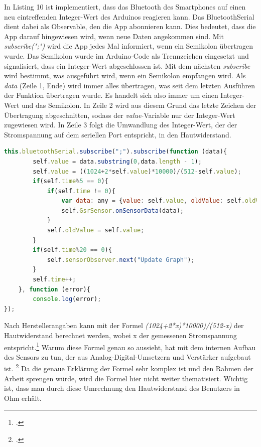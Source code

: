 \newline
In Listing 10 ist implementiert, dass das Bluetooth des Smartphones auf einen neu eintreffenden Integer-Wert des Arduinos reagieren kann. Das BluetoothSerial dient dabei als Observable, den die App abonnieren kann. Dies bedeutet, dass die App darauf hingewiesen wird, wenn neue Daten angekommen sind. Mit \textit{subscribe(";")} wird die App jedes Mal informiert, wenn ein Semikolon übertragen wurde. Das Semikolon wurde im Arduino-Code als Trennzeichen eingesetzt und signalisiert, dass ein Integer-Wert abgeschlossen ist. Mit dem nächsten \textit{subscribe} wird bestimmt, was ausgeführt wird, wenn ein Semikolon empfangen wird. Als \textit{data} (Zeile 1, Ende) wird immer alles übertragen, was seit dem letzten Ausführen der Funktion übertragen wurde. Es handelt sich also immer um einen Integer-Wert und das Semikolon. In Zeile 2 wird aus diesem Grund das letzte Zeichen der Übertragung abgeschnitten, sodass der \textit{value}-Variable nur der Integer-Wert zugewiesen wird.
In Zeile 3 folgt die Umwandlung des Integer-Wert, der der Stromspannung auf dem seriellen Port entspricht, in den Hautwiderstand. \newline
\begin{lstlisting}[caption={Verarbeitung der Sensordaten}, language=JavaScript]
this.bluetoothSerial.subscribe(";").subscribe(function (data){
		self.value = data.substring(0,data.length - 1);
		self.value = ((1024+2*self.value)*10000)/(512-self.value);
		if(self.time%5 == 0){
			if(self.time != 0){
				var data: any = {value: self.value, oldValue: self.oldValue};
				self.GsrSensor.onSensorData(data);
			}
			self.oldValue = self.value;
		} 
		if(self.time%20 == 0){
			self.sensorObserver.next("Update Graph");
		}
		self.time++;
	}, function (error){
		console.log(error);
});
\end{lstlisting}
Nach Herstellerangaben kann mit der Formel \textit{(1024+2*x)*10000)/(512-x)} der Hautwiderstand berechnet werden, wobei x der gemessenen Stromspannung entspricht.\footcite[Vgl.][]{Gro18} Warum diese Formel genau so aussieht, hat mit dem internen Aufbau des Sensors zu tun, der aus Analog-Digital-Umsetzern und Verstärker aufgebaut ist. \footcite[Vgl.][1. Forumsantwort]{Com18} Da die genaue Erklärung der Formel sehr komplex ist und den Rahmen der Arbeit sprengen würde, wird die Formel hier nicht weiter thematisiert. Wichtig ist, dass man durch diese Umrechnung den Hautwiderstand des Benutzers in Ohm erhält. \newline
